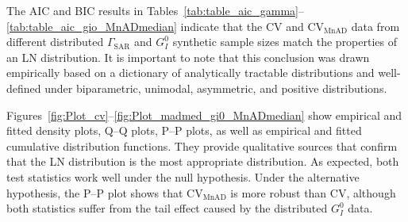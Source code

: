 The AIC and BIC results in
Tables~\ref{tab:table_aic_gamma}--\ref{tab:table_aic_gio_MnADmedian}
indicate that the CV and \(\text{CV}_{\text{MnAD}}\) data from different
distributed \(\Gamma_{\text{SAR}}\) and \(G_I^0\) synthetic sample sizes
match the properties of an LN distribution. It is important to note that
this conclusion was drawn empirically based on a dictionary of
analytically tractable distributions and well-defined under
biparametric, unimodal, asymmetric, and positive distributions.

Figures~\ref{fig:Plot_cv}--\ref{fig:Plot_madmed_gi0_MnADmedian} show
empirical and fitted density plots, Q--Q plots, P--P plots, as well as
empirical and fitted cumulative distribution functions. They provide
qualitative sources that confirm that the LN distribution is the most
appropriate distribution. As expected, both test statistics work well
under the null hypothesis. Under the alternative hypothesis, the P--P
plot shows that \(\text{CV}_{\text{MnAD}}\) is more robust than CV,
although both statistics suffer from the tail effect caused by the
distributed \(G_I^0\) data.


